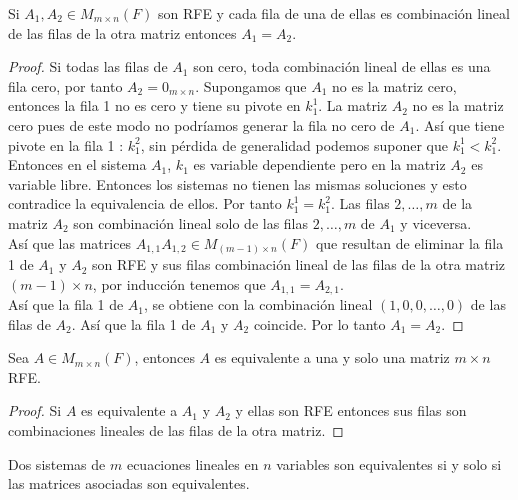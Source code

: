 \documentclass[12pt,a4paper]{book}
\begin{document}
    \begin{proposicion}
    \label{prop:5}
        Si $A_{1},A_{2}\in M_{m\times n}(F)$ son RFE y cada fila de una de ellas es
        combinación lineal de las filas de la otra matriz entonces $A_{1}=A_{2}$.
    \end{proposicion}

    \begin{proof}
        Si todas las filas de $A_{1}$ son cero, toda combinación lineal de ellas es una fila cero,
        por tanto $A_{2}=0_{m\times n}$. Supongamos que $A_{1}$ no es la matriz cero, entonces la fila
        1 no es cero y tiene su pivote en $k_{1}^{1}$. La matriz $A_{2}$ no es la matriz cero pues de este modo
        no podríamos generar la fila no cero de $A_{1}$. Así que tiene pivote en la fila 1 : $k_{1}^{2}$,
        sin pérdida de generalidad podemos suponer que $k_{1}^{1}\lt k_{1}^{2}$. Entonces en el sistema $A_{1}$,
        $k_{1}$ es variable dependiente pero en la matriz $A_{2}$ es variable libre. Entonces los sistemas no tienen
        las mismas soluciones y esto contradice la equivalencia de ellos. Por tanto $k_{1}^{1}=k_{1}^{2}$.
        Las filas $2,\dots,m$ de la matriz $A_{2}$ son combinación lineal solo de las filas
        $2,\dots,m$ de $A_{1}$ y viceversa.\\
        Así que las matrices $A_{1,1}A_{1,2}\in M_{(m-1)\times n}(F)$ que
        resultan de eliminar la fila 1 de $A_{1}$ y $A_{2}$ son RFE y sus filas combinación lineal de las filas
        de la otra matriz $(m-1)\times n$, por inducción tenemos que $A_{1,1}=A_{2,1}$.\\
        Así que la fila 1 de $A_{1}$, se obtiene con la combinación lineal $(1,0,0,\dots,0)$ de las filas de $A_{2}$.
        Así que la fila 1 de $A_{1}$ y $A_{2}$ coincide. Por lo tanto $A_{1}=A_{2}$.
    \end{proof}

    \begin{corolario}
    \label{coro:2}
        Sea $A\in M_{m\times n}(F)$, entonces $A$ es equivalente a una y solo una matriz $m\times n$ RFE.
    \end{corolario}

    \begin{proof}
        Si $A$ es equivalente a $A_{1}$ y $A_{2}$ y ellas son RFE entonces sus filas
        son combinaciones lineales de las filas de la otra matriz.
    \end{proof}

    \begin{proposicion}
    \label{prop:6}
        Dos sistemas de $m$ ecuaciones lineales en $n$ variables son equivalentes si
        y solo si las matrices asociadas son equivalentes.
    \end{proposicion}
\end{document}
